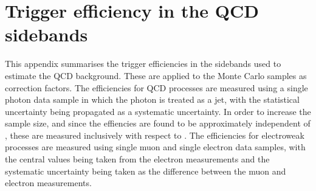\section{Trigger efficiency in the QCD sidebands}
\label{sec:qcd-trigger}

This appendix summarises the trigger efficiencies in the sidebands used to
estimate the QCD background. These are applied to the Monte Carlo samples as
correction factors. The efficiencies for QCD processes are measured
using a single photon data sample in which the photon is treated as a jet, 
with the statistical uncertainty being
propagated as a systematic uncertainty. In order to increase the sample size,
and since the effiencies are found to be approximately independent of \bdphi,
these are measured inclusively with respect to \bdphi.
The efficiencies for electroweak processes are measured using single muon and
single electron data samples, with the central values being taken from the 
electron measurements and the systematic uncertainty being taken as the 
difference between the muon and electron measurements.







